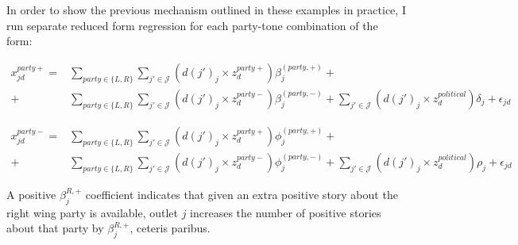 \documentclass[12pt]{article}
\begin{document}
	
	
	In order to show the previous mechanism outlined in these examples in practice, I run separate reduced form regression for each party-tone combination of the form: 
	
	

	
	\begin{equation}\label{eq:pred_pos}
	\begin{aligned}
x^{party+}_{jd}=& \sum_{party \in \{L,R\}} \sum_{j' \in \mathcal{J} }  \left(d(j')_j \times z^{party+} _d      \right) \beta_{j}^{(party,+ )}  + \\
		+ &   \sum_{party \in \{L,R\}} \sum_{j' \in \mathcal{J} }   \left(d(j')_j \times z^{party-} _d      \right) \beta_{j}^{(party,- )} +    \sum_{j' \in \mathcal{J} }   \left(d(j')_j \times z^{political}_d      \right) \delta_{j} +\epsilon_{jd}
	\end{aligned}	
\end{equation} 



\begin{equation}\label{eq:pred_neg}
	\begin{aligned}
	x^{party-}_{jd}=& \sum_{party \in \{L,R\}} \sum_{j' \in \mathcal{J} }  \left(d(j')_j \times z^{party+} _d      \right) \phi_{j}^{(party,+ )}  + \\
		+ &   \sum_{party \in \{L,R\}} \sum_{j' \in \mathcal{J} }   \left(d(j')_j \times z^{party-} _d      \right) \phi_{j}^{(party,- )} +    \sum_{j' \in \mathcal{J} }   \left(d(j')_j \times z^{political}_d      \right) \rho_{j} +\epsilon_{jd}
	\end{aligned}
\end{equation} 
	
	
	A positive $ \beta_{j}^{R,+} $ coefficient indicates that given an extra positive story about the right wing party is available, outlet $ j $ increases the number of positive stories about that party by $  \beta_{j}^{R,+}  $, ceteris paribus. 
	
\end{document}
